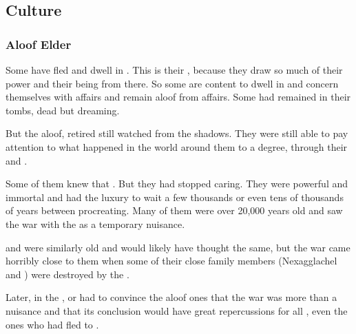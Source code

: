 \subsection{Culture}





\subsubsection{Aloof Elder \Dragons}
Some \dragons have fled \Miith and dwell in \Machai. 
This is their , because they draw so much of their power and their being from there.
So some are content to dwell in \Machai and concern themselves with \Machaic affairs and remain aloof from \Miithian affairs. 
Some had remained in their tombs, dead but dreaming. 

But the aloof, retired \dragons still watched \Miith from the shadows.
They were still able to pay attention to what happened in the world around them to a degree, through their \daemons and \homunculi.



Some of them knew that .
But they had stopped caring. 
They were powerful and immortal and had the luxury to wait a few thousands or even tens of thousands of years between procreating. 
Many of them were over 20,000 years old and saw the war with the \resphain as a temporary nuisance. 

\Ishnaruchaefir and \Secherdamon were similarly old and would likely have thought the same, but the war came horribly close to them when some of their close family members (Nexagglachel and ) were destroyed by the \resphain.

Later, in the \thirdbanewar, \Secherdamon or \Ishnaruchaefir had to convince the aloof ones that the war was more than a nuisance and that its conclusion would have great repercussions for all \dragons, even the ones who had fled to \Machai.

